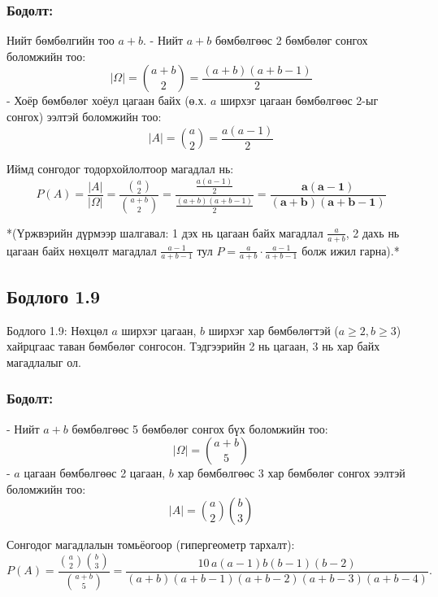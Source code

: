 \documentclass[11pt,a4paper]{article}
\begin{document}
\subsubsection*{Бодолт:}

Нийт бөмбөлгийн тоо $a + b$.
- Нийт $a+b$ бөмбөлгөөс 2 бөмбөлөг сонгох боломжийн тоо:
  \[
    |\Omega| = \binom{a+b}{2} = \frac{(a+b)(a+b-1)}{2}
  \]
- Хоёр бөмбөлөг хоёул цагаан байх (ө.х. $a$ ширхэг цагаан бөмбөлгөөс 2-ыг сонгох) ээлтэй боломжийн тоо:
  \[
    |A| = \binom{a}{2} = \frac{a(a-1)}{2}
  \]

Иймд сонгодог тодорхойлолтоор магадлал нь:
\[
  P(A) = \frac{|A|}{|\Omega|} = \frac{\binom{a}{2}}{\binom{a+b}{2}} = \frac{\frac{a(a-1)}{2}}{\frac{(a+b)(a+b-1)}{2}} = \mathbf{\frac{a(a-1)}{(a+b)(a+b-1)}}
\]

*(Үржвэрийн дүрмээр шалгавал: 1 дэх нь цагаан байх магадлал $\frac{a}{a+b}$, 2 дахь нь цагаан байх нөхцөлт магадлал $\frac{a-1}{a+b-1}$ тул $P = \frac{a}{a+b} \cdot \frac{a-1}{a+b-1}$ болж ижил гарна).*

\vspace{0.8em}

\subsection*{Бодлого 1.9}

\begin{problembox}{Бодлого 1.9: Нөхцөл}
$a$ ширхэг цагаан, $b$ ширхэг хар бөмбөлөгтэй ($a \ge 2, b \ge 3$) хайрцгаас таван бөмбөлөг сонгосон. Тэдгээрийн 2 нь цагаан, 3 нь хар байх магадлалыг ол.
\end{problembox}

\subsubsection*{Бодолт:}

- Нийт $a+b$ бөмбөлгөөс 5 бөмбөлөг сонгох бүх боломжийн тоо:
  \[
    |\Omega| = \binom{a+b}{5}
  \]
- $a$ цагаан бөмбөлгөөс 2 цагаан, $b$ хар бөмбөлгөөс 3 хар бөмбөлөг сонгох ээлтэй боломжийн тоо:
  \[
    |A| = \binom{a}{2} \binom{b}{3}
  \]

Сонгодог магадлалын томьёогоор (гипергеометр тархалт):
\[
  P(A) = \frac{\binom{a}{2}\binom{b}{3}}{\binom{a+b}{5}}
       = \frac{10\,a(a-1)b(b-1)(b-2)}{(a+b)(a+b-1)(a+b-2)(a+b-3)(a+b-4)}.
\]
\end{document}
